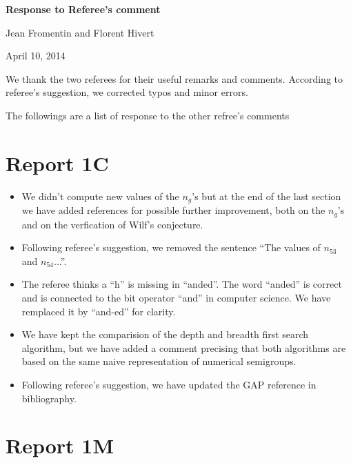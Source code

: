 \documentclass{amsart}
\begin{document}
 
\begin{center}
\textbf{Response to Referee's comment}

 Jean Fromentin and Florent Hivert
 
 April 10, 2014
\end{center}

\vspace{2em}

We thank the two referees for their useful remarks and comments.
According to referee's suggestion, we corrected typos and minor errors.

The followings are a list of response to the other refree's comments 

\vspace{2em}

\section{Report 1C}

\begin{itemize}
\item We didn't compute new values of the $n_g$'s but at the end of the last section we have added references for possible further improvement,
both on the $n_g$'s and on the verfication of Wilf's conjecture.

 \item Following referee's suggestion, we removed the sentence ``The values of $n_{53}$ and $n_{54}$...''.
 
 \item The referee thinks a ``h'' is missing in ``anded''.  The word ``anded'' is correct and is connected to the bit operator ``and'' in computer science.
 We have remplaced it by ``and-ed'' for clarity.
 
 \item We have kept the comparision of the depth and breadth first search algorithm, but we have added a comment precising that both algorithms are based on the same naive representation of numerical semigroups.
 
 \item Following referee's suggestion, we have updated the GAP reference in bibliography.
\end{itemize}

\section{Report 1M}
\end{document}

